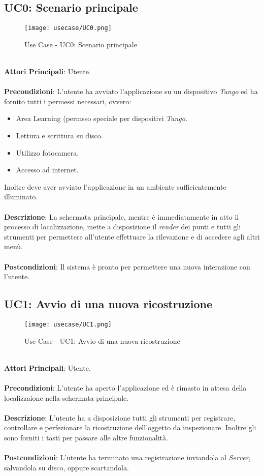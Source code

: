 \subsection{UC0: Scenario principale}
\begin{figure}[!h] 
    \centering 
    \texttt{[image: usecase/UC0.png]} 
    \caption{Use Case - UC0: Scenario principale}
\end{figure}
\ \\
\textbf{Attori Principali}: Utente.
\\\\ \textbf{Precondizioni}: L'utente ha avviato l'applicazione su un dispositivo \emph{Tango} ed ha fornito tutti i permessi necessari, ovvero:
\begin{itemize}
	\item Area Learning (permsso speciale per dispositivi \emph{Tango}.
	\item Lettura e scrittura su disco.
	\item Utilizzo fotocamera.
	\item Accesso ad internet.
\end{itemize}
Inoltre deve aver avviato l'applicazione in un ambiente sufficientemente illuminato.
\\\\ \textbf{Descrizione}: La schermata principale, mentre è immediatamente in atto il processo di localizzazione, mette a disposizione il \emph{render} dei punti e tutti gli strumenti per permettere all'utente effettuare la rilevazione e di accedere agli altri menù.
\\\\ \textbf{Postcondizioni}: Il sistema è pronto per permettere una nuova interazione con l'utente.


\subsection{UC1: Avvio di una nuova ricostruzione}
\begin{figure}[!h] 
    \centering 
    \texttt{[image: usecase/UC1.png]} 
    \caption{Use Case - UC1: Avvio di una nuova ricostruzione}
\end{figure}
\ \\
\textbf{Attori Principali}: Utente.
\\\\ \textbf{Precondizioni}: L'utente ha aperto l'applicazione ed è rimasto in attesa della localizzaione nella schermata principale.
\\\\ \textbf{Descrizione}: L'utente ha a disposizione tutti gli strumenti per registrare, controllare e perfezionare la ricostruzione dell'oggetto da inspezionare. Inoltre gli sono forniti i tasti per passare alle altre funzionalità. 
\\\\ \textbf{Postcondizioni}: L'utente ha terminato una registrazione inviandola al \emph{Server}, salvandola su disco, oppure scartandola.



